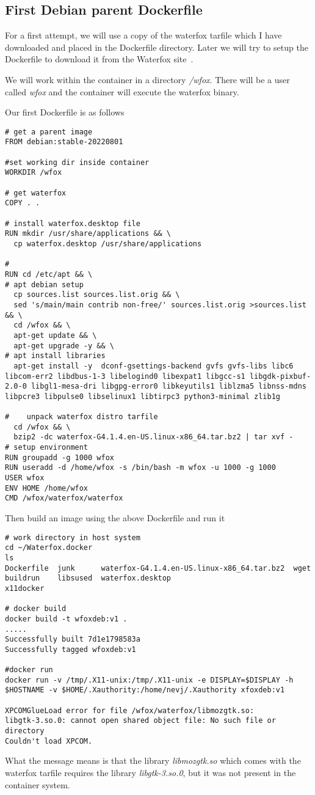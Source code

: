 \documentclass{article}  %
\begin{document}
\subsection{First Debian parent Dockerfile}
For a first attempt, we will use a copy of the waterfox tarfile which I have downloaded and placed in the Dockerfile directory. Later we will try to setup the Dockerfile to download it from the Waterfox site~\cite{wate:22b}.

We will work within the container in a directory {\em /wfox}. There will be a user called {\em wfox} and the container will execute the waterfox binary.

Our first Dockerfile is as follows
\begin{verbatim}
# get a parent image
FROM debian:stable-20220801

#set working dir inside container
WORKDIR /wfox

# get waterfox
COPY . .

# install waterfox.desktop file
RUN mkdir /usr/share/applications && \
  cp waterfox.desktop /usr/share/applications

#  
RUN cd /etc/apt && \
# apt debian setup
  cp sources.list sources.list.orig && \
  sed 's/main/main contrib non-free/' sources.list.orig >sources.list && \
  cd /wfox && \
  apt-get update && \
  apt-get upgrade -y && \
# apt install libraries
  apt-get install -y  dconf-gsettings-backend gvfs gvfs-libs libc6 libcom-err2 libdbus-1-3 libelogind0 libexpat1 libgcc-s1 libgdk-pixbuf-2.0-0 libgl1-mesa-dri libgpg-error0 libkeyutils1 liblzma5 libnss-mdns libpcre3 libpulse0 libselinux1 libtirpc3 python3-minimal zlib1g

#    unpack waterfox distro tarfile
  cd /wfox && \
  bzip2 -dc waterfox-G4.1.4.en-US.linux-x86_64.tar.bz2 | tar xvf - 
# setup environment
RUN groupadd -g 1000 wfox
RUN useradd -d /home/wfox -s /bin/bash -m wfox -u 1000 -g 1000
USER wfox
ENV HOME /home/wfox
CMD /wfox/waterfox/waterfox
\end{verbatim}
 Then build an image using the above Dockerfile and run it
\begin{verbatim}
# work directory in host system
cd ~/Waterfox.docker
ls
Dockerfile  junk      waterfox-G4.1.4.en-US.linux-x86_64.tar.bz2  wget
buildrun    libsused  waterfox.desktop                            x11docker

# docker build
docker build -t wfoxdeb:v1 .
.....
Successfully built 7d1e1798583a
Successfully tagged wfoxdeb:v1

#docker run
docker run -v /tmp/.X11-unix:/tmp/.X11-unix -e DISPLAY=$DISPLAY -h $HOSTNAME -v $HOME/.Xauthority:/home/nevj/.Xauthority xfoxdeb:v1

XPCOMGlueLoad error for file /wfox/waterfox/libmozgtk.so:
libgtk-3.so.0: cannot open shared object file: No such file or directory
Couldn't load XPCOM.
\end{verbatim}
 What the message means is that the library {\em libmozgtk.so} which comes with the waterfox tarfile requires the library {\em libgtk-3.so.0}, but it was not present in the container system.
\end{document}
